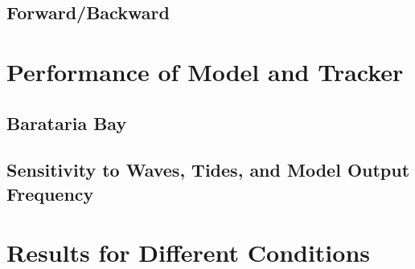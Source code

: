 \documentclass[11pt]{article}
\begin{document}







\subsection{Forward/Backward}


\section{Performance of Model and Tracker}

\subsection{Barataria Bay}

\subsection{Sensitivity to Waves, Tides, and Model Output Frequency}


\section{Results for Different Conditions}

\end{document}
